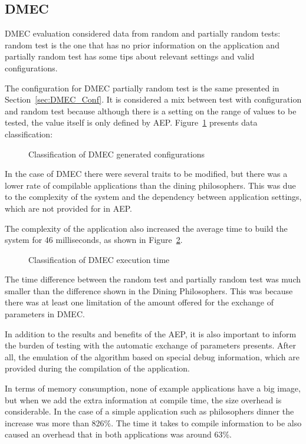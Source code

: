 \documentclass[conference]{IEEEtran}
\newcommand{\fig}[4][thb]{
  \begin{figure}[#1] {\centering{\texttt{[image: fig/\#2]}}\par}
    \captionsetup{font=small}
    \caption{#3\label{fig:#2}}
  \end{figure}
}
\begin{document}
\subsection{DMEC}
DMEC evaluation considered data from random and partially random tests: random test is the one that has no prior information on the application and partially random test has some tips about relevant settings and valid configurations.

The configuration for DMEC partially random test is the same presented in Section~\ref{sec:DMEC_Conf}. It is considered a mix between test with  configuration and random test because although there is a setting on the range of values to be tested, the value itself is only defined by AEP. Figure~\ref{fig:dmec_results} presents data classification:

\fig{dmec_results}{Classification of DMEC generated configurations}{scale=.55}

In the case of DMEC there were several traits to be modified, but there was a lower rate of compilable applications than the dining philosophers. This was due to the complexity of the system and the dependency between application settings, which are not provided for in AEP.

The complexity of the application also increased the average time to build the system for 46 milliseconds, as shown in Figure~\ref{fig:dmec_time_results}.

\fig{dmec_time_results}{Classification of DMEC execution time}{scale=.45}

The time difference between the random test and partially random test was much smaller than the difference shown in the Dining Philosophers. This was because there was at least one limitation of the amount offered for the exchange of parameters in DMEC.

In addition to the results and benefits of the AEP,  it is also important to inform the burden of testing with the automatic exchange of parameters presents. After all, the emulation of the algorithm based on special debug information, which are provided during the compilation of the application. 

In terms of memory consumption, none of example applications have a big image, but when we add the extra information at compile time, the size overhead is  considerable. In the case of a simple application such as philosophers dinner the increase was more than 826\%. The time it takes to compile information to be also caused an overhead that in both applications was around 63\%.
\end{document}
